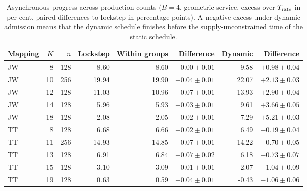 \begin{table}[htbp]
\centering\footnotesize
\begin{tabular}{lrrrrrrr}
\toprule
Mapping & $K$ & $n$ & Lockstep & Within groups & Difference & Dynamic & Difference\\\midrule
JW & 8 & 128 & 8.60 & 8.60 & $+0.00\pm0.01$ & 9.58 & $+0.98\pm0.04$\\
JW & 10 & 256 & 19.94 & 19.90 & $-0.04\pm0.01$ & 22.07 & $+2.13\pm0.03$\\
JW & 12 & 128 & 11.03 & 10.96 & $-0.07\pm0.01$ & 13.93 & $+2.90\pm0.04$\\
JW & 14 & 128 & 5.96 & 5.93 & $-0.03\pm0.01$ & 9.61 & $+3.66\pm0.05$\\
JW & 18 & 128 & 2.08 & 2.05 & $-0.02\pm0.01$ & 7.29 & $+5.21\pm0.03$\\
TT & 8 & 128 & 6.68 & 6.66 & $-0.02\pm0.01$ & 6.49 & $-0.19\pm0.04$\\
TT & 11 & 256 & 14.93 & 14.85 & $-0.07\pm0.01$ & 14.22 & $-0.70\pm0.05$\\
TT & 13 & 128 & 6.91 & 6.84 & $-0.07\pm0.02$ & 6.18 & $-0.73\pm0.07$\\
TT & 15 & 128 & 3.10 & 3.09 & $-0.01\pm0.01$ & 2.07 & $-1.04\pm0.09$\\
TT & 19 & 128 & 0.63 & 0.59 & $-0.04\pm0.01$ & -0.43 & $-1.06\pm0.06$\\
\bottomrule
\end{tabular}
\caption{Asynchronous progress across production counts ($B=4$, geometric service, excess over $T_{\rm rate}$ in per cent, paired differences to lockstep in percentage points). A negative excess under dynamic admission means that the dynamic schedule finishes before the supply-unconstrained time of the static schedule.}
\label{tab:asyncsweep}
\end{table}
